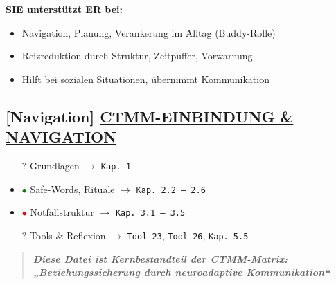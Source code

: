 \textbf{SIE unterstützt ER bei:}

\begin{itemize}
\tightlist
\item
  Navigation, Planung, Verankerung im Alltag (Buddy-Rolle)
\item
  Reizreduktion durch Struktur, Zeitpuffer, Vorwarnung
\item
  Hilft bei sozialen Situationen, übernimmt Kommunikation
\end{itemize}

\hypertarget{ctmm-einbindung-navigation}{%
\subsection{\texorpdfstring{[Navigation] \textbf{\ul{CTMM-EINBINDUNG \& NAVIGATION}}}{[Navigation] CTMM-EINBINDUNG \& NAVIGATION}}\label{ctmm-einbindung-navigation}}

\begin{itemize}
\tightlist
\item
  [?] Grundlagen $\rightarrow$ \texttt{Kap.\ }\texttt{1}
\item
  \textcolor{green}{$\bullet$} Safe-Words, Rituale $\rightarrow$ \texttt{Kap.\ }\texttt{2.2\ --\ 2.6}
\item
  \textcolor{red}{$\bullet$} Notfallstruktur $\rightarrow$ \texttt{Kap.\ }\texttt{3.1\ --\ 3.5}
\item
  [?] Tools \& Reflexion $\rightarrow$ \texttt{Tool\ 23}, \texttt{Tool\ 26}, \texttt{Kap.\ }\texttt{5.5}
\end{itemize}

\begin{quote}
\emph{\textbf{Diese Datei ist Kernbestandteil der CTMM-Matrix: „Beziehungssicherung durch neuroadaptive Kommunikation``}}
\end{quote}
